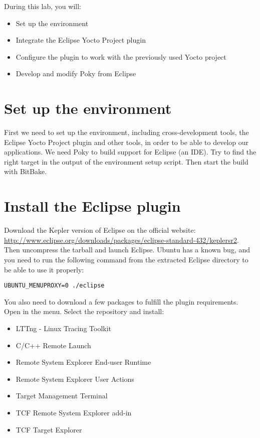 
During this lab, you will:
\begin{itemize}
  \item Set up the environment
  \item Integrate the Eclipse Yocto Project plugin
  \item Configure the plugin to work with the previously used Yocto project
  \item Develop and modify Poky from Eclipse
\end{itemize}

\section{Set up the environment}

First we need to set up the environment, including cross-development tools, the
Eclipse Yocto Project plugin and other tools, in order to be able to develop our
applications. We need Poky to build support for Eclipse (an IDE). Try to
find the right target in the output of the environment setup script. Then
start the build with BitBake.

\section{Install the Eclipse plugin}

Download the Kepler version of Eclipse on the official website:
\url{http://www.eclipse.org/downloads/packages/eclipse-standard-432/keplersr2}.
Then uncompress the tarball and launch Eclipse. Ubuntu has a known bug, and
you need to run the following command from the extracted Eclipse directory to be
able to use it properly:
\begin{verbatim}
UBUNTU_MENUPROXY=0 ./eclipse
\end{verbatim}

You also need to download a few packages to fulfill the plugin requirements. Open
 in the  menu. Select the  repository and install:
\begin{itemize}
  \item LTTng - Linux Tracing Toolkit
  \item C/C++ Remote Launch
  \item Remote System Explorer End-user Runtime
  \item Remote System Explorer User Actions
  \item Target Management Terminal
  \item TCF Remote System Explorer add-in
  \item TCF Target Explorer
\end{itemize}

